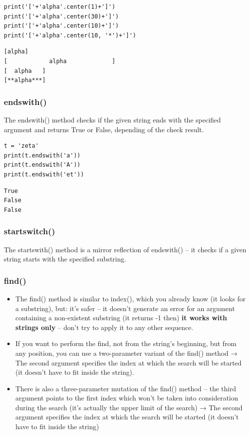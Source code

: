 \documentclass[11pt]{article}
\begin{document}
\begin{verbatim}
print('['+'alpha'.center(1)+']')
print('['+'alpha'.center(30)+']')
print('['+'alpha'.center(10)+']')
print('['+'alpha'.center(10, '*')+']')
\end{verbatim}

\begin{verbatim}
[alpha]
[            alpha             ]
[  alpha   ]
[**alpha***]
\end{verbatim}

\subsubsection{endswith()}
\label{sec:orgc7898e7}
The endswith() method checks if the given string ends with the
specified argument and returns True or False, depending of the check
result.

\begin{verbatim}
t = 'zeta'
print(t.endswith('a'))
print(t.endswith('A'))
print(t.endswith('et'))
\end{verbatim}

\begin{verbatim}
True
False
False
\end{verbatim}

\subsubsection{startswitch()}
\label{sec:orga5f3221}
The startswith() method is a mirror reflection of endswith() ­– it
checks if a given string starts with the specified substring.
\subsubsection{find()}
\label{sec:org8bd25ab}
\begin{itemize}
\item The find() method is similar to index(), which you already know (it
looks for a substring), but: it’s safer – it doesn’t generate an
error for an argument containing a non-existent substring (it
returns -1 then) \textbf{it works with strings only} – don’t try to apply
it to any other sequence.
\item If you want to perform the find, not from the string’s beginning,
but from any position, you can use a two-parameter variant of the
find() method → The second argument specifies the index at which the
search will be started (it doesn’t have to fit inside the string).
\item There is also a three-parameter mutation of the find() method – the
third argument points to the first index which won’t be taken into
consideration during the search (it’s actually the upper limit of
the search) → The second argument specifies the index at which the
search will be started (it doesn’t have to fit inside the string)
\end{itemize}
\end{document}
